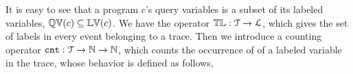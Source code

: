 %
It is easy to see that a program $c$'s query variables is a subset of 
its labeled variables, $\mathbb{QV}(c) \subseteq \mathbb{LV}(c)$. We have the operator $\mathbb{TL} : \mathcal{T} \to \mathcal{L}$, which gives the set of labels in every event belonging to a trace.
Then we introduce a counting operator $\mathtt{cnt} : \mathcal{T} \to \mathbb{N} \to \mathbb{N}$, 
which counts the occurrence of of a labeled variable in the trace,
whose behavior is defined as follows,
